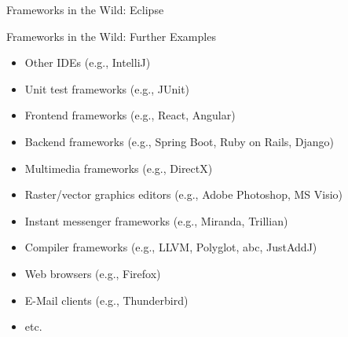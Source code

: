 \begin{frame}{Frameworks in the Wild: Eclipse \mytitlesource{\featureide}}
	\begin{fancycolumns}%
	\nextcolumn
	\end{fancycolumns}
\end{frame}

\begin{frame}{Frameworks in the Wild: Further Examples}
	\begin{fancycolumns}[columns=3,widths={15,70},animation=none]
	\nextcolumn
		\begin{example}{}
			\begin{itemize}
				\item Other IDEs (e.g., IntelliJ)
				\item Unit test frameworks (e.g., JUnit)
				\item Frontend frameworks (e.g., React, Angular)
				\item Backend frameworks (e.g., Spring Boot, Ruby on Rails, Django) 
				\item Multimedia frameworks (e.g., DirectX)
				\item Raster/vector graphics editors (e.g., Adobe Photoshop, MS Visio)
				\item Instant messenger frameworks (e.g., Miranda, Trillian)
				\item Compiler frameworks (e.g., LLVM, Polyglot, abc, JustAddJ)
				\item Web browsers (e.g., Firefox)
				\item E-Mail clients (e.g., Thunderbird)
				\item etc.
			\end{itemize}
		\end{example}		
	\nextcolumn
	\end{fancycolumns}
\end{frame}

